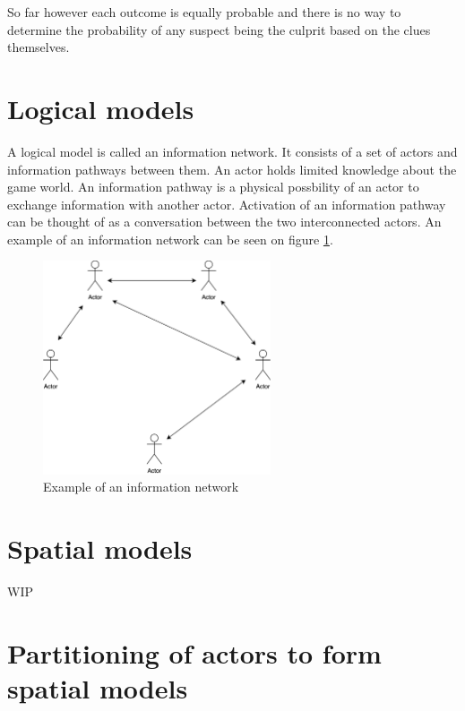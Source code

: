 So far however each outcome is equally probable and there is no way to determine the probability of any suspect being the culprit based on the clues themselves.

\section{Logical models}

A logical model is called an information network.
It consists of a set of actors and information pathways between them.
An actor holds limited knowledge about the game world.
An information pathway is a physical possbility of an actor to exchange information with another actor.
Activation of an information pathway can be thought of as a conversation between the two interconnected actors.
An example of an information network can be seen on figure \ref{fig:logical_model_example}.

\begin{figure}
    \centering
    \includegraphics[width=0.6\textwidth]{images/logical_model_example.png}
    \caption{Example of an information network}
    \label{fig:logical_model_example}
\end{figure}

\section{Spatial models}

WIP

\section{Partitioning of actors to form spatial models}

